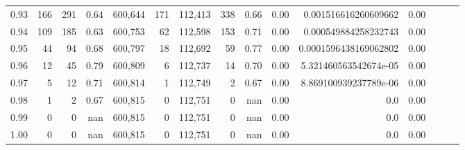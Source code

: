 \begin{tabular}{rrrrrrrrrrrrrrr}
0.93 &     166 &    291 &  0.64 &  600,644 &      171 &  112,413 &      338 &  0.66 &  0.00 &   0.001516616260609662 &      0.00 \\
0.94 &     109 &    185 &  0.63 &  600,753 &       62 &  112,598 &      153 &  0.71 &  0.00 &   0.000549884258232743 &      0.00 \\
0.95 &      44 &     94 &  0.68 &  600,797 &       18 &  112,692 &       59 &  0.77 &  0.00 &  0.0001596438169062802 &      0.00 \\
0.96 &      12 &     45 &  0.79 &  600,809 &        6 &  112,737 &       14 &  0.70 &  0.00 &  5.321460563542674e-05 &      0.00 \\
0.97 &       5 &     12 &  0.71 &  600,814 &        1 &  112,749 &        2 &  0.67 &  0.00 &  8.869100939237789e-06 &      0.00 \\
0.98 &       1 &      2 &  0.67 &  600,815 &        0 &  112,751 &        0 &   nan &  0.00 &                    0.0 &      0.00 \\
0.99 &       0 &      0 &   nan &  600,815 &        0 &  112,751 &        0 &   nan &  0.00 &                    0.0 &      0.00 \\
1.00 &       0 &      0 &   nan &  600,815 &        0 &  112,751 &        0 &   nan &  0.00 &                    0.0 &      0.00 \\
\bottomrule
\end{tabular}
